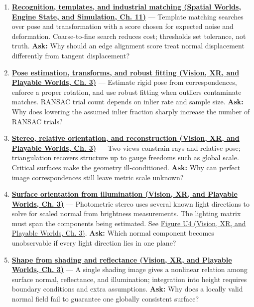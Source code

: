 \begin{enumerate}
\item
  \textbf{\href{../05-Spatial-Worlds-Engine-State-and-Simulation/main.pdf\#nameddest=04-visual-computing-ii-ch030-recognition-templates-and-industrial-matching}{Recognition, templates, and industrial matching (Spatial Worlds, Engine State, and Simulation, Ch. 11)}} --- Template matching searches over pose and transformation with a score chosen for expected noise and deformation. Coarse-to-fine search reduces cost; thresholds set tolerance, not truth. \textbf{Ask:} Why should an edge alignment score treat normal displacement differently from tangent displacement?
\item
  \textbf{\href{../07-Vision-XR-and-Playable-Worlds/main.pdf\#nameddest=04-visual-computing-ii-ch032-pose-estimation-transforms-and-robust-fitting}{Pose estimation, transforms, and robust fitting (Vision, XR, and Playable Worlds, Ch. 3)}} --- Estimate rigid pose from correspondences, enforce a proper rotation, and use robust fitting when outliers contaminate matches. RANSAC trial count depends on inlier rate and sample size. \textbf{Ask:} Why does lowering the assumed inlier fraction sharply increase the number of RANSAC trials?
\item
  \textbf{\href{../07-Vision-XR-and-Playable-Worlds/main.pdf\#nameddest=04-visual-computing-ii-ch032-stereo-relative-orientation-and-reconstruction}{Stereo, relative orientation, and reconstruction (Vision, XR, and Playable Worlds, Ch. 3)}} --- Two views constrain rays and relative pose; triangulation recovers structure up to gauge freedoms such as global scale. Critical surfaces make the geometry ill-conditioned. \textbf{Ask:} Why can perfect image correspondences still leave metric scale unknown?
\item
  \textbf{\href{../07-Vision-XR-and-Playable-Worlds/main.pdf\#nameddest=04-visual-computing-ii-ch032-surface-orientation-from-illumination}{Surface orientation from illumination (Vision, XR, and Playable Worlds, Ch. 3)}} --- Photometric stereo uses several known light directions to solve for scaled normal from brightness measurements. The lighting matrix must span the components being estimated. See \href{../07-Vision-XR-and-Playable-Worlds/main.pdf\#nameddest=04-visual-computing-ii-ch032-figure-u4---lighting-rank-determines-which-normal-components-can-be-measured}{Figure U4 (Vision, XR, and Playable Worlds, Ch. 3)}. \textbf{Ask:} Which normal component becomes unobservable if every light direction lies in one plane?
\item
  \textbf{\href{../07-Vision-XR-and-Playable-Worlds/main.pdf\#nameddest=04-visual-computing-ii-ch032-shape-from-shading-and-reflectance}{Shape from shading and reflectance (Vision, XR, and Playable Worlds, Ch. 3)}} --- A single shading image gives a nonlinear relation among surface normal, reflectance, and illumination; integration into height requires boundary conditions and extra assumptions. \textbf{Ask:} Why does a locally valid normal field fail to guarantee one globally consistent surface?

\end{enumerate}
